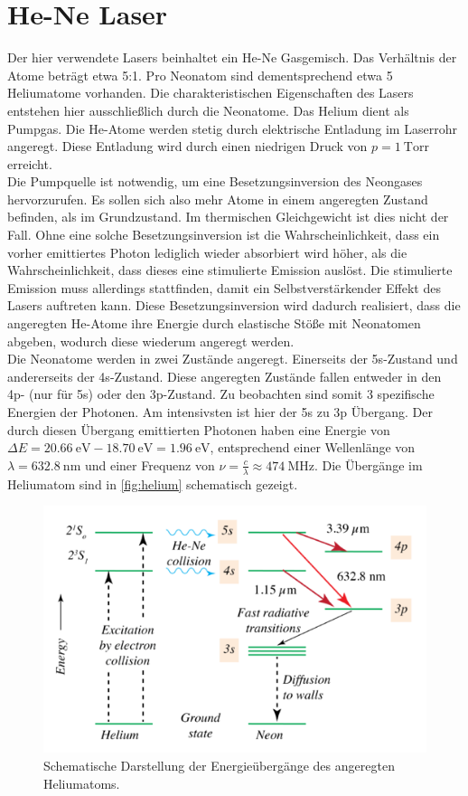 \section{He-Ne Laser}

Der hier verwendete Lasers beinhaltet ein He-Ne Gasgemisch. Das Verhältnis der Atome beträgt etwa 5:1. Pro
Neonatom sind dementsprechend etwa 5 Heliumatome vorhanden. Die charakteristischen Eigenschaften des Lasers entstehen hier ausschließlich
durch die Neonatome. Das Helium dient als Pumpgas. Die He-Atome werden stetig durch elektrische Entladung im Laserrohr angeregt.
Diese Entladung wird durch einen niedrigen Druck von $p = \qty{1}{\mathrm{Torr}}$ erreicht.\\
Die Pumpquelle ist notwendig, um eine Besetzungsinversion des Neongases hervorzurufen. Es sollen sich also mehr Atome in einem angeregten
Zustand befinden, als im Grundzustand. Im thermischen Gleichgewicht ist dies nicht der Fall. Ohne eine solche Besetzungsinversion ist die Wahrscheinlichkeit, dass ein vorher emittiertes
Photon lediglich wieder absorbiert wird höher, als die Wahrscheinlichkeit, dass dieses eine stimulierte Emission auslöst. Die stimulierte
Emission muss allerdings stattfinden, damit ein Selbstverstärkender Effekt des Lasers auftreten kann.
Diese Besetzungsinversion wird dadurch realisiert, dass die angeregten He-Atome ihre Energie durch elastische Stöße mit Neonatomen abgeben,
wodurch diese wiederum angeregt werden. \\
Die Neonatome werden in zwei Zustände angeregt. Einerseits der 5s-Zustand und andererseits der 4s-Zustand. Diese angeregten
Zustände fallen entweder in den 4p- (nur für 5s) oder den 3p-Zustand. Zu beobachten sind somit 3 spezifische Energien der Photonen.
Am intensivsten ist hier der 5s zu 3p Übergang. Der durch diesen Übergang emittierten Photonen haben eine Energie von 
$\Delta E = \qty{20.66}{\electronvolt} - \qty{18.70}{\electronvolt} = \qty{1.96}{\electronvolt}$, entsprechend einer 
Wellenlänge von $\lambda = \qty{632.8}{\nano\metre}$ und einer Frequenz von $\nu = \frac{c}{\lambda} \approx \qty{474}{\mega\hertz}$.
Die Übergänge im Heliumatom sind in \autoref{fig:helium} schematisch gezeigt.
\begin{figure}
    \centering
    \includegraphics[width = \textwidth]{v61_bilder/helium.png}
    \caption{Schematische Darstellung der Energieübergänge des angeregten Heliumatoms.}
    \label{fig:helium}
\end{figure}

